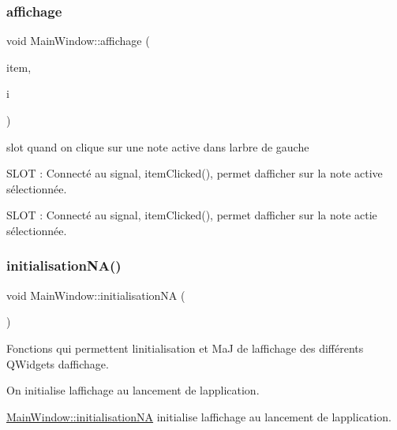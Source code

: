 \subsubsection{\texorpdfstring{affichage}{affichage}}
{\footnotesize\ttfamily void Main\+Window\+::affichage (\begin{DoxyParamCaption}\item[{Q\+Tree\+Widget\+Item $\ast$}]{item,  }\item[{int}]{i }\end{DoxyParamCaption})\hspace{0.3cm}{\ttfamily [slot]}}



slot quand on clique sur une note active dans l\textquotesingle{}arbre de gauche 

S\+L\+OT \+: Connecté au signal, item\+Clicked(), permet d\textquotesingle{}afficher sur la note active sélectionnée.

S\+L\+OT \+: Connecté au signal, item\+Clicked(), permet d\textquotesingle{}afficher sur la note actie sélectionnée. \mbox{\label{classMainWindow_afd599be0a61a634d3a91a53dfb7679cf}} 
\subsubsection{\texorpdfstring{initialisation\+N\+A()}{initialisationNA()}}
{\footnotesize\ttfamily void Main\+Window\+::initialisation\+NA (\begin{DoxyParamCaption}{ }\end{DoxyParamCaption})}



Fonctions qui permettent l\textquotesingle{}initialisation et MaJ de l\textquotesingle{}affichage des différents Q\+Widgets d\textquotesingle{}affichage. 

On initialise l\textquotesingle{}affichage au lancement de l\textquotesingle{}application.

\hyperlink{classMainWindow_afd599be0a61a634d3a91a53dfb7679cf}{Main\+Window\+::initialisation\+NA} initialise l\textquotesingle{}affichage au lancement de l\textquotesingle{}application. \mbox{\label{classMainWindow_a379d0333137913ea4e2fe46bd123d815}} 
